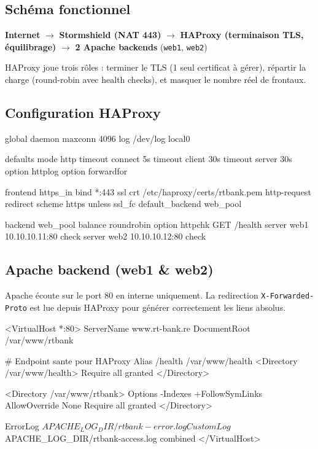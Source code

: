 \documentclass[11pt,a4paper]{article}
\begin{document}
\subsection{Schéma fonctionnel}

\begin{secbox}[title={\faProjectDiagram~Chaîne de traitement}]
\textbf{Internet} $\rightarrow$ \textbf{Stormshield (NAT 443)} $\rightarrow$ \textbf{HAProxy (terminaison TLS, équilibrage)} $\rightarrow$ \textbf{2 Apache backends} (\texttt{web1}, \texttt{web2})
\end{secbox}

HAProxy joue trois rôles : terminer le TLS (1 seul certificat à gérer), répartir la charge (round-robin avec health checks), et masquer le nombre réel de frontaux.

\subsection{Configuration HAProxy}

\begin{cfgbox}
global
    daemon
    maxconn 4096
    log /dev/log local0

defaults
    mode http
    timeout connect 5s
    timeout client  30s
    timeout server  30s
    option httplog
    option forwardfor

frontend https_in
    bind *:443 ssl crt /etc/haproxy/certs/rtbank.pem
    http-request redirect scheme https unless { ssl_fc }
    default_backend web_pool

backend web_pool
    balance roundrobin
    option httpchk GET /health
    server web1 10.10.10.11:80 check
    server web2 10.10.10.12:80 check
\end{cfgbox}

\subsection{Apache backend (web1 \& web2)}

Apache écoute sur le port 80 en interne uniquement. La redirection \texttt{X-Forwarded-Proto} est lue depuis HAProxy pour générer correctement les liens absolus.

\begin{cfgbox}
<VirtualHost *:80>
    ServerName www.rt-bank.re
    DocumentRoot /var/www/rtbank

    # Endpoint sante pour HAProxy
    Alias /health /var/www/health
    <Directory /var/www/health>
        Require all granted
    </Directory>

    <Directory /var/www/rtbank>
        Options -Indexes +FollowSymLinks
        AllowOverride None
        Require all granted
    </Directory>

    ErrorLog  ${APACHE_LOG_DIR}/rtbank-error.log
    CustomLog ${APACHE_LOG_DIR}/rtbank-access.log combined
</VirtualHost>
\end{cfgbox}
\end{document}
